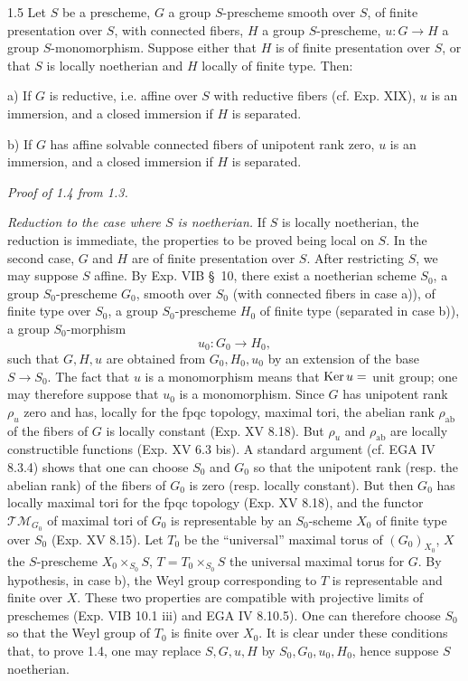 \begin{corollary}{1.5}\label{XVI.1.5}
Let $S$ be a prescheme, $G$ a group $S$-prescheme smooth over $S$, of finite presentation over $S$, with connected fibers, $H$ a group $S$-prescheme, $u:G\to H$ a group $S$-monomorphism. Suppose either that $H$ is of finite presentation over $S$, or that $S$ is locally noetherian and $H$ locally of finite type. Then:

\noindent a) If $G$ is reductive, i.e. affine over $S$ with reductive fibers (cf. Exp. XIX), $u$ is an immersion, and a closed immersion if $H$ is separated.

\noindent b) If $G$ has affine solvable connected fibers of unipotent rank zero, $u$ is an immersion, and a closed immersion if $H$ is separated.
\end{corollary}
\par\noindent\emph{Proof of 1.4 from 1.3.}
\par\noindent\emph{Reduction to the case where $S$ is noetherian.}
If $S$ is locally noetherian, the reduction is immediate, the properties to be proved being local on $S$. In the second case, $G$ and $H$ are of finite presentation over $S$. After restricting $S$, we may suppose $S$ affine. By Exp. VIB \S\ 10, there exist a noetherian scheme $S_0$, a group $S_0$-prescheme $G_0$, smooth over $S_0$ (with connected fibers in case a)), of finite type over $S_0$, a group $S_0$-prescheme $H_0$ of finite type (separated in case b)), a group $S_0$-morphism
\[
u_0:G_0\longrightarrow H_0,
\]
such that $G,H,u$ are obtained from $G_0,H_0,u_0$ by an extension of the base $S\to S_0$. The fact that $u$ is a monomorphism means that $\operatorname{Ker} u=$ unit group; one may therefore suppose that $u_0$ is a monomorphism. Since $G$ has unipotent rank $\rho_u$ zero and has, locally for the fpqc topology, maximal tori, the abelian rank $\rho_{\mathrm{ab}}$ of the fibers of $G$ is locally constant (Exp. XV 8.18). But $\rho_u$ and $\rho_{\mathrm{ab}}$ are locally constructible functions (Exp. XV 6.3 bis). A standard argument (cf. EGA IV 8.3.4) shows that one can choose $S_0$ and $G_0$ so that the unipotent rank (resp. the abelian rank) of the fibers of $G_0$ is zero (resp. locally constant). But then $G_0$ has locally maximal tori for the fpqc topology (Exp. XV 8.18), and the functor $\mathscr{TM}_{G_0}$ of maximal tori of $G_0$ is representable by an $S_0$-scheme $X_0$ of finite type over $S_0$ (Exp. XV 8.15). Let $T_0$ be the ``universal'' maximal torus of $(G_0)_{X_0}$, $X$ the $S$-prescheme $X_0\times_{S_0}S$, $T=T_0\times_{S_0}S$ the universal maximal torus for $G$. By hypothesis, in case b), the Weyl group corresponding to $T$ is representable and finite over $X$. These two properties are compatible with projective limits of preschemes (Exp. VIB 10.1 iii) and EGA IV 8.10.5). One can therefore choose $S_0$ so that the Weyl group of $T_0$ is finite over $X_0$. It is clear under these conditions that, to prove 1.4, one may replace $S,G,u,H$ by $S_0,G_0,u_0,H_0$, hence suppose $S$ noetherian.

